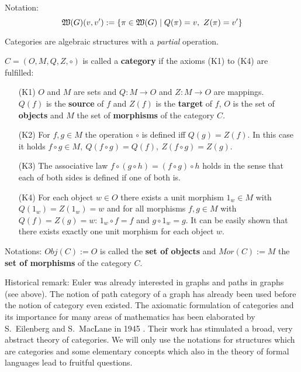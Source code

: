 Notation: 
\[ \mbox{$\mathfrak{W}(G)$}(v, v') := \{ \pi \in \mbox{$\mathfrak{W}(G)$} \mid Q(\pi) = v,\ Z(\pi) = v' \}
\]

Categories are algebraic structures with a {\em partial} operation.

\begin{definition}
$C = (O, M, Q, Z, \circ)$ is called a {\bf category} if the axioms (K1) to
(K4) are fulfilled:
\begin{enumerate}
  \item[(K1)] $O$ and $M$ are sets and $Q: M \to O$ and $Z: M \to O$ are
  mappings.\\
  $Q(f)$ is the {\bf source} of $f$ and $Z(f)$ is the {\bf target} of $f$, $O$
  is the set of {\bf objects} and $M$ the set of {\bf morphisms} of the category $C$.
  \item[(K2)] For $f, g \in M$ the operation $\circ$ is defined iff $Q(g) =
  Z(f)$. In this case it holds $f \circ g \in M,\ Q(f \circ g) = Q(f),\ Z(f
  \circ g) = Z(g)$.
  \item[(K3)] The associative law $f \circ (g \circ h) = (f \circ g) \circ h$
  holds in the sense that each of both sides is defined if one of both is.
  \item[(K4)] For each object $w \in O$ there exists a unit morphism $1_w \in M$
  with $Q(1_w) = Z(1_w) = w$ and for all morphisms $f, g \in M$ with $Q(f) =
  Z(g) = w$: $1_w \circ f = f$ and $g \circ 1_w = g$. It can be easily shown
  that there exists exactly one unit morphism for each object $w$.
\end{enumerate}
\end{definition}

Notations: $Obj(C) := O$ is called the {\bf set of objects} and $Mor(C) := M$
the {\bf set of morphisms} of the category $C$.

Historical remark: Euler was already interested in graphs and paths in graphs
(see above). The notion of path category of a graph has already been used before
the notion of category even existed. The axiomatic formulation of categories and its 
importance for many areas of mathematics has been elaborated by S.\ Eilenberg
and S.\ MacLane in 1945 \cite{EiMa}. Their work has stimulated a broad, very abstract theory 
of categories. We will only use the notations for structures which are
categories and some elementary concepts which also in the theory of formal languages lead
to fruitful questions.

